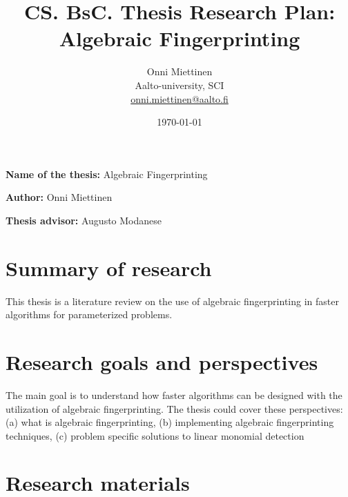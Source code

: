 \documentclass[12pt,a4paper,english,oneside]{article}
\begin{document}

\title{CS. BsC. Thesis Research Plan:\\[5mm]
Algebraic Fingerprinting}

\author{Onni Miettinen\\
Aalto-university, SCI\\
\url{onni.miettinen@aalto.fi}}

\date{\today}

\maketitle


\vspace{10mm}

%

\textbf{Name of the thesis:} Algebraic Fingerprinting

\textbf{Author:} Onni Miettinen

\textbf{Thesis advisor:} Augusto Modanese


\section{Summary of research}

This thesis is a literature review on the use of algebraic fingerprinting in faster algorithms for parameterized problems.

\section{Research goals and perspectives}

The main goal is to understand how faster algorithms can be designed with the utilization of algebraic fingerprinting.
The thesis could cover these perspectives: 
(a) what is algebraic fingerprinting,
(b) implementing algebraic fingerprinting techniques,
(c) problem specific solutions to linear monomial detection

\section{Research materials}
\end{document}
